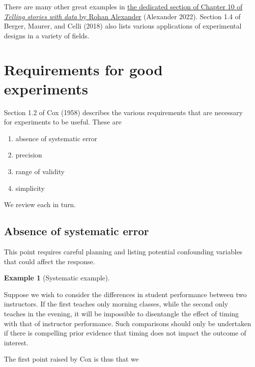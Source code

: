 \documentclass[
  11pt,
  letterpaper,
]{scrbook}
\providecommand{\tightlist}{%
  \setlength{\itemsep}{0pt}\setlength{\parskip}{0pt}}\usepackage{longtable,booktabs,array}
\theoremstyle{definition}
\newtheorem{example}{Example}[chapter]
\theoremstyle{definition}
\theoremstyle{remark}
\begin{document}
There are many other great examples in
\href{https://tellingstorieswithdata.com/08-hunt.html\#rct-examples}{the
dedicated section of Chapter 10 of \emph{Telling stories with data} by
Rohan Alexander} (Alexander 2022). Section 1.4 of Berger, Maurer, and
Celli (2018) also lists various applications of experimental designs in
a variety of fields.

\section{Requirements for good
experiments}\label{requirements-for-good-experiments}

Section 1.2 of Cox (1958) describes the various requirements that are
necessary for experiments to be useful. These are

\begin{enumerate}
\def\labelenumi{\arabic{enumi}.}
\tightlist
\item
  absence of systematic error
\item
  precision
\item
  range of validity
\item
  simplicity
\end{enumerate}

We review each in turn.

\subsection{Absence of systematic
error}\label{absence-of-systematic-error}

This point requires careful planning and listing potential confounding
variables that could affect the response.

\begin{example}[Systematic
example]\protect\hypertarget{exm-systematicerror}{}\label{exm-systematicerror}

Suppose we wish to consider the differences in student performance
between two instructors. If the first teaches only morning classes,
while the second only teaches in the evening, it will be impossible to
disentangle the effect of timing with that of instructor performance.
Such comparisons should only be undertaken if there is compelling prior
evidence that timing does not impact the outcome of interest.

\end{example}

The first point raised by Cox is thus that we
\end{document}

